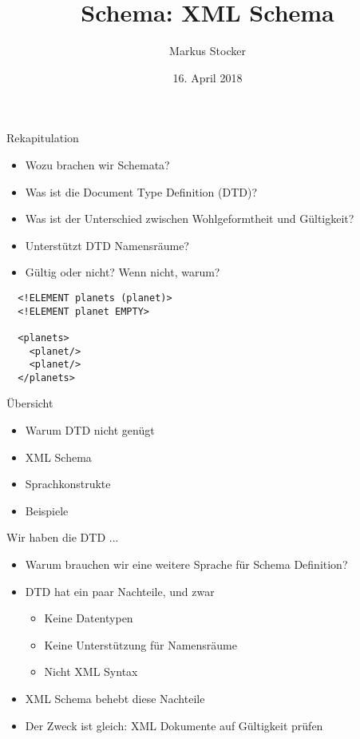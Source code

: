 \documentclass{beamer}
\title{Schema: XML Schema}
\author{Markus Stocker}
\date{16. April 2018}
\begin{document}
\maketitle

\begin{frame}[fragile]{Rekapitulation}
	
	\begin{itemize}
		\item Wozu brachen wir Schemata?
		\item Was ist die Document Type Definition (DTD)?
		\item Was ist der Unterschied zwischen Wohlgeformtheit und Gültigkeit?
		\item Unterstützt DTD Namensräume?
		\item Gültig oder nicht? Wenn nicht, warum?
	\end{itemize}
	
	\lstset{language=XML}
	\begin{lstlisting}	
  <!ELEMENT planets (planet)>
  <!ELEMENT planet EMPTY>
	
  <planets>
    <planet/>
    <planet/>
  </planets>		
	\end{lstlisting}
	
\end{frame}

\begin{frame}{Übersicht}
	
	\begin{itemize}
		\item Warum DTD nicht genügt
		\item XML Schema
		\item Sprachkonstrukte
		\item Beispiele
	\end{itemize}
	
\end{frame}

\begin{frame}{Wir haben die DTD ...}
	
	\begin{itemize}
		\item Warum brauchen wir eine weitere Sprache für Schema Definition?
		\item DTD hat ein paar Nachteile, und zwar
		\begin{itemize}
			\item Keine Datentypen
			\item Keine Unterstützung für Namensräume
			\item Nicht XML Syntax
		\end{itemize}
		\item XML Schema behebt diese Nachteile
		\item Der Zweck ist gleich: XML Dokumente auf Gültigkeit prüfen
	\end{itemize}
	
\end{frame}
\end{document}
